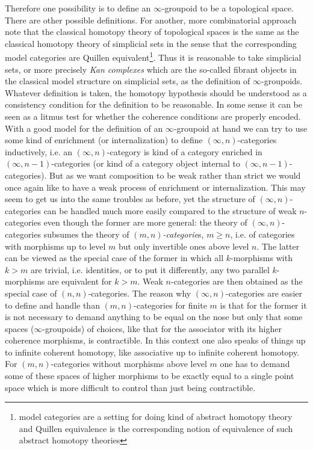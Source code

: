 Therefore one possibility is to define an $\infty$-groupoid to be a topological space. There are other possible definitions. For another, more combinatorial approach note that the classical homotopy theory of topological spaces is the same as the classical homotopy theory of simplicial sets in the sense that the corresponding model categories are Quillen equivalent\footnote{model categories are a setting for doing kind of abstract homotopy theory and Quillen equivalence is the corresponding notion of equivalence of such abstract homotopy theories}. Thus it is reasonable to take simplicial sets, or more precisely \textit{Kan complexes} which are the so-called fibrant objects in the classical model structure on simplicial sets, as the definition of $\infty$-groupoids. Whatever definition is taken, the homotopy hypothesis should be understood as a consistency condition for the definition to be reasonable. In some sense it can be seen as a litmus test for whether the coherence conditions are properly encoded. 
\\
With a good model for the definition of an $\infty$-groupoid at hand we can try to use some kind of enrichment (or internalization) to define $(\infty,n)$-categories inductively, i.e. an $(\infty,n)$-category is kind of a category enriched in $(\infty,n-1)$-categories (or kind of a category object internal to $(\infty,n-1)$-categories). But as we want composition to be weak rather than strict we would once again like to have a weak process of enrichment or internalization. This may seem to get us into the same troubles as before, yet the structure of $(\infty,n)$-categories can be handled much more easily compared to the structure of weak $n$-categories even though the former are more general: the theory of $(\infty,n)$-categories subsumes the theory of \textit{$(m,n)$-categorie}s, $m \geq n$, i.e. of categories with morphisms up to level $m$ but only invertible ones above level $n$. The latter can be viewed as the special case of the former in which all $k$-morphisms with $k > m$ are trivial, i.e. identities, or to put it differently, any two parallel $k$-morphisms are equivalent for $k > m$. Weak $n$-categories are then obtained as the special case of $(n,n)$-categories. The reason why $(\infty,n)$-categories are easier to define and handle than $(m,n)$-categories for finite $m$ is that for the former it is not necessary to demand anything to be equal on the nose but only that some spaces ($\infty$-groupoids) of choices, like that for the associator with its higher coherence morphisms, is contractible. In this context one also speaks of things {\glqq}up to infinite coherent homotopy{\grqq}, like associative up to infinite coherent homotopy. For $(m,n)$-categories without morphisms above level $m$ one has to demand some of these spaces of higher morphisms to be exactly equal to a single point space which is more difficult to control than just being contractible.
